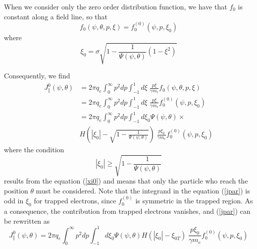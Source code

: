 \documentclass[12pt,a4paper]{article}
\begin{document}
When we consider only the zero order distribution function, we have that $%
f_{0}$ is constant along a field line, so that 
\begin{equation}
f_{0}\left( \psi,\theta,p,\xi\right) =f_{0}^{(0)}\left( \psi,p,\xi
_{0}\right)
\end{equation}
where 
\begin{equation}
\xi_{0}=\sigma\sqrt{1-\frac{1}{\Psi\left( \psi,\theta\right) }\left(
1-\xi^{2}\right) }  \label{xi0}
\end{equation}

Consequently, we find 
\begin{align}
J_{\Vert}^{0}\left( \psi,\theta\right) & =2\pi
q_{e}\int_{0}^{\infty}p^{2}dp\int_{-1}^{1}d\xi\;\frac{p\xi}{\gamma m_{e}}
f_{0}\left( \psi ,\theta,p,\xi\right)  \nonumber \\
& =2\pi q_{e}\int_{0}^{\infty}p^{2}dp\int_{-1}^{1}d\xi\;\frac{p\xi}{\gamma
m_{e}}f_{0}^{(0)}\left( \psi,p,\xi_{0}\right)  \nonumber \\
& =2\pi q_{e}\int_{0}^{\infty}p^{2}dp\int_{-1}^{1}d\xi_{0}\Psi\left(
\psi,\theta\right) \times  \nonumber \\
& H\left( \left| \xi_{0}\right| -\sqrt{1-\frac{1}{\Psi\left( \psi
,\theta\right) }}\right) \;\frac{p\xi_{0}}{\gamma m_{e}}f_{0}^{(0)}\left(
\psi,p,\xi_{0}\right)  \label{jpar}
\end{align}
where the condition 
\begin{equation}
\left| \xi_{0}\right| \geq\sqrt{1-\frac{1}{\Psi\left( \psi,\theta\right) }}
\label{xi0cond}
\end{equation}
results from the equation (\ref{xi0}) and means that only the particle who
reach the position $\theta$ must be considered. Note that the integrand in
the equation (\ref{jpar}) is odd in $\xi_{0}$ for trapped electrons, since $%
f_{0}^{(0)}$ is symmetric in the trapped region. As a consequence, the
contribution from trapped electrons vanishes, and (\ref{jpar}) can be
rewritten as 
\begin{equation}
J_{\Vert}^{0}\left( \psi,\theta\right) =2\pi
q_{e}\int_{0}^{\infty}p^{2}dp\int_{-1}^{1}d\xi_{0}\Psi\left(
\psi,\theta\right) H\left( \left| \xi_{0}\right| -\xi_{0T}\right) \;\frac{
p\xi_{0}}{\gamma m_{e}}f_{0}^{(0)}\left( \psi,p,\xi_{0}\right)
\end{equation}
\end{document}
